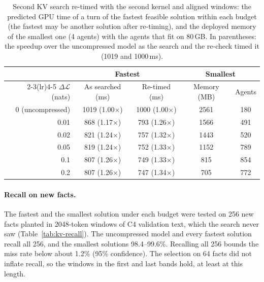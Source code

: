 \documentclass[11pt]{article}
\newcommand{\dloss}{\Delta\mathcal{L}}
\begin{document}
\begin{table}[htbp]
\centering
\small
\begin{tabular}{rcccc}
\toprule
& \multicolumn{2}{c}{Fastest} & \multicolumn{2}{c}{Smallest} \\
\cmidrule(lr){2-3}\cmidrule(lr){4-5}
$\dloss$ (nats) & As searched (ms) & Re-timed (ms) & Memory (MB) & Agents \\
\midrule
0 (uncompressed) & 1019 (1.00$\times$) & 1000 (1.00$\times$) & 2561 & 180 \\
\midrule
0.01 & 868 (1.17$\times$) & 793 (1.26$\times$) & 1566 & 491 \\
0.02 & 821 (1.24$\times$) & 757 (1.32$\times$) & 1443 & 520 \\
0.05 & 819 (1.24$\times$) & 752 (1.33$\times$) & 1152 & 789 \\
0.1  & 807 (1.26$\times$) & 749 (1.33$\times$) &  815 & 854 \\
0.2  & 807 (1.26$\times$) & 747 (1.34$\times$) &  705 & 772 \\
\bottomrule
\end{tabular}
\caption{Second KV search re-timed with the second kernel and aligned windows: the predicted GPU time of a
turn of the fastest feasible solution within each budget (the fastest may be another solution after
re-timing), and the deployed memory of the smallest one (4 agents) with the agents that fit on 80\,GB.
In parentheses: the speedup over the uncompressed model as the search and the re-check timed it (1019 and
1000\,ms).}
\label{tab:kv-retimed}
\end{table}

\paragraph{Recall on new facts.} The fastest and the smallest solution under each budget were tested on
256 new facts planted in 2048-token windows of C4 validation text, which the search never saw
(Table~\ref{tab:kv-recall}). The uncompressed model and every fastest solution recall all 256, and the
smallest solutions 98.4--99.6\%. Recalling all 256 bounds the miss rate below about 1.2\% (95\% confidence).
The selection on 64 facts did not inflate recall, so the windows in the first and last bands hold, at
least at this length.
\end{document}

